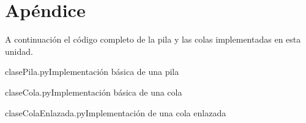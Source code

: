 \newpage
\section{Apéndice}

A continuación el código completo de la pila y las colas implementadas en
esta unidad.

\begin{codigo}{clasePila.py}{Implementación básica de una pila}

\end{codigo}

\begin{codigo}{claseCola.py}{Implementación básica de una cola}

\end{codigo}

\begin{codigo}{claseColaEnlazada.py}{Implementación de una cola enlazada}

\end{codigo}

